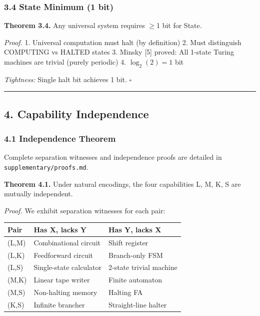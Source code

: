 \documentclass[
  11pt,
]{article}
\begin{document}
\hypertarget{state-minimum-1-bit}{%
\subsubsection{3.4 State Minimum (1 bit)}\label{state-minimum-1-bit}}

\textbf{Theorem 3.4.} Any universal system requires $\geq$1 bit for State.

\emph{Proof.} 1. Universal computation must halt (by definition) 2. Must
distinguish COMPUTING vs HALTED states 3. Minsky {[}5{]} proved: All
1-state Turing machines are trivial (purely periodic) 4. $\log_2(2) = 1$ bit

\emph{Tightness:} Single halt bit achieves 1 bit. $\square$

\begin{center}\rule{0.5\linewidth}{0.5pt}\end{center}

\hypertarget{capability-independence}{%
\subsection{4. Capability Independence}\label{capability-independence}}

\hypertarget{independence-theorem}{%
\subsubsection{4.1 Independence Theorem}\label{independence-theorem}}

Complete separation witnesses and independence proofs are detailed in
\texttt{supplementary/proofs.md}.

\textbf{Theorem 4.1.} Under natural encodings, the four capabilities L,
M, K, S are mutually independent.

\emph{Proof.} We exhibit separation witnesses for each pair:

\begin{longtable}[]{@{}lll@{}}
\toprule\noalign{}
Pair & Has X, lacks Y & Has Y, lacks X \\
\midrule\noalign{}
\endhead
\bottomrule\noalign{}
\endlastfoot
(L,M) & Combinational circuit & Shift register \\
(L,K) & Feedforward circuit & Branch-only FSM \\
(L,S) & Single-state calculator & 2-state trivial machine \\
(M,K) & Linear tape writer & Finite automaton \\
(M,S) & Non-halting memory & Halting FA \\
(K,S) & Infinite brancher & Straight-line halter \\
\end{longtable}
\end{document}
